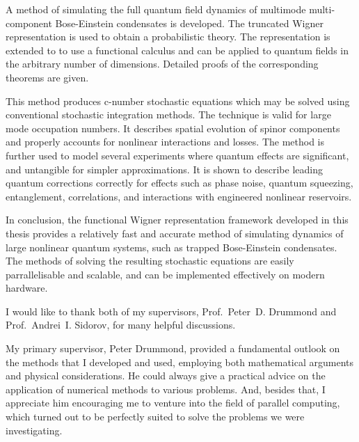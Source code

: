 

\cleardoublepage



A method of simulating the full quantum field dynamics of multimode multi-component Bose-Einstein condensates is developed.
The truncated Wigner representation is used to obtain a probabilistic theory.
The representation is extended to to use a functional calculus and can be applied to quantum fields in the arbitrary number of dimensions.
Detailed proofs of the corresponding theorems are given.

This method produces c-number stochastic equations which may be solved using conventional stochastic integration methods.
The technique is valid for large mode occupation numbers.
It describes spatial evolution of spinor components and properly accounts for nonlinear interactions and losses.
The method is further used to model several experiments where quantum effects are significant, and untangible for simpler approximations.
It is shown to describe leading quantum corrections correctly for effects such as phase noise, quantum squeezing, entanglement,  correlations, and interactions with engineered nonlinear reservoirs.

In conclusion, the functional Wigner representation framework developed in this thesis provides a relatively fast and accurate method of simulating dynamics of large nonlinear quantum systems, such as trapped Bose-Einstein condensates.
The methods of solving the resulting stochastic equations are easily parrallelisable and scalable, and can be implemented effectively on modern hardware.


\cleardoublepage


I would like to thank both of my supervisors, Prof.~Peter~D. Drummond and Prof.~Andrei~I. Sidorov, for many helpful discussions.

My primary supervisor, Peter Drummond, provided a fundamental outlook on the methods that I developed and used, employing both mathematical arguments and physical considerations.
He could always give a practical advice on the application of numerical methods to various problems.
And, besides that, I appreciate him encouraging me to venture into the field of parallel computing, which turned out to be perfectly suited to solve the problems we were investigating.

